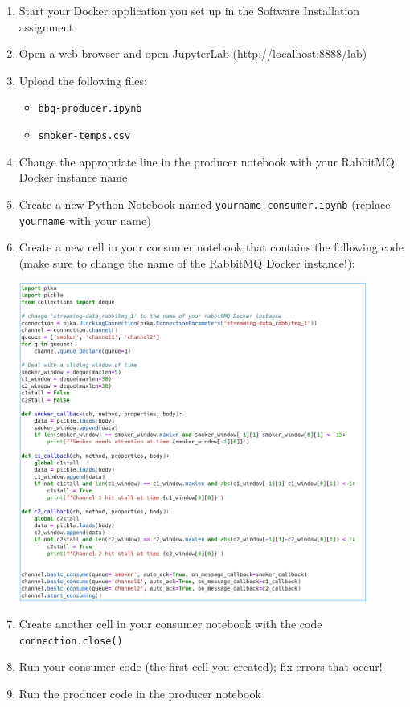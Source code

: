 \documentclass[letterpaper,10pt]{article}
\begin{document}
\begin{enumerate}
	\item Start your Docker application you set up in the Software Installation assignment
	\item Open a web browser and open JupyterLab (\url{http://localhost:8888/lab})
	\item Upload the following files:
		\begin{itemize}
			\item \texttt{bbq-producer.ipynb}
			\item \texttt{smoker-temps.csv}
		\end{itemize}
	\item Change the appropriate line in the producer notebook with your RabbitMQ Docker instance name
	\item Create a new Python Notebook named \texttt{yourname-consumer.ipynb} (replace \texttt{yourname} with your name)
	\item Create a new cell in your consumer notebook that contains the following code (make sure to change the name of the RabbitMQ Docker instance!):
		\begin{center}
			\includegraphics[width=0.9\textwidth]{consumer-code.PNG}
		\end{center}
	\item Create another cell in your consumer notebook with the code \texttt{connection.close()}
	\item Run your consumer code (the first cell you created); fix errors that occur!
	\item Run the producer code in the producer notebook

\end{enumerate}
\end{document}
